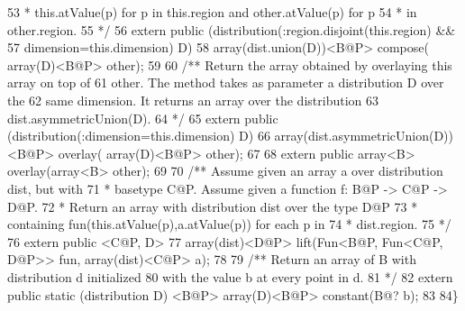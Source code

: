 \begin{tightcode}
\quad\num{53}     * this.atValue(p) for p in this.region and other.atValue(p) for p
\quad\num{54}     * in other.region.
\quad\num{55}     */
\quad\num{56}    extern public (distribution(:region.disjoint(this.region) &&
\quad\num{57}                                dimension=this.dimension) D)
\quad\num{58}        array(dist.union(D))<B@P> compose( array(D)<B@P> other);
\quad\num{59}
\quad\num{60}    /** Return the array obtained by overlaying this array on top of
\quad\num{61}        other. The method takes as parameter a distribution D over the
\quad\num{62}        same dimension. It returns an array over the distribution
\quad\num{63}        dist.asymmetricUnion(D).
\quad\num{64}     */
\quad\num{65}    extern public (distribution(:dimension=this.dimension) D)
\quad\num{66}        array(dist.asymmetricUnion(D))<B@P> overlay( array(D)<B@P> other);
\quad\num{67}
\quad\num{68}    extern public array<B> overlay(array<B> other);
\quad\num{69}
\quad\num{70}    /** Assume given an array a over distribution dist, but with
\quad\num{71}     * basetype C@P. Assume given a function f: B@P -> C@P -> D@P.
\quad\num{72}     * Return an array with distribution dist over the type D@P
\quad\num{73}     * containing fun(this.atValue(p),a.atValue(p)) for each p in
\quad\num{74}     * dist.region.
\quad\num{75}     */
\quad\num{76}    extern public <C@P, D>
\quad\num{77}        array(dist)<D@P> lift(Fun<B@P, Fun<C@P, D@P>> fun, array(dist)<C@P> a);
\quad\num{78}
\quad\num{79}    /**  Return an array of B with distribution d initialized
\quad\num{80}         with the value b at every point in d.
\quad\num{81}     */
\quad\num{82}    extern public static (distribution D) <B@P> array(D)<B@P> constant(B@? b);
\quad\num{83}
\quad\num{84}\}
\end{tightcode}
